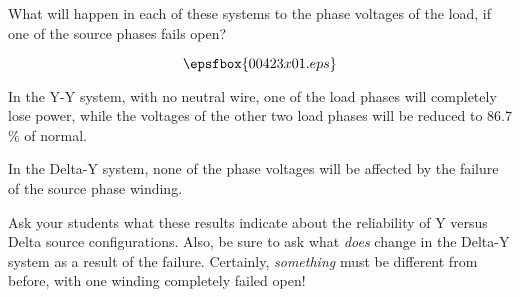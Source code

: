 

What will happen in each of these systems to the phase voltages of the load, if one of the source phases fails open?

$$\epsfbox{00423x01.eps}$$







In the Y-Y system, with no neutral wire, one of the load phases will completely lose power, while the voltages of the other two load phases will be reduced to 86.7 \% of normal.

In the Delta-Y system, none of the phase voltages will be affected by the failure of the source phase winding.







Ask your students what these results indicate about the reliability of Y versus Delta source configurations.  Also, be sure to ask what {\it does} change in the Delta-Y system as a result of the failure.  Certainly, {\it something} must be different from before, with one winding completely failed open!




